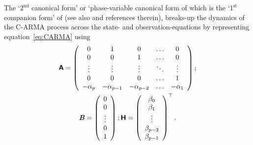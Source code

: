 \documentclass[a4paper,fleqn,usenatbib]{mnras}
\begin{document}
The `$2^{\mathrm{nd}}$ canonical form' or `phase-variable canonical form of \citet{Wiberg} which is the `$1^{\mathrm{st}}$ companion form' of \citet{Friedland} (see also \citealp{Kelly14} and references therein), breaks-up the dynamics of the C-ARMA process across the state- and observation-equations by representing equation~\eqref{eq:CARMA} using
\begin{multline}\label{eq:2ndCanForm}
\textbf{\textsf{A}} = \left( \begin{array}{ccccc} 
0 & 1 & 0 & \hdots & 0 \\
0 & 0 & 1 & \hdots & 0 \\
\vdots & \vdots & \vdots & \ddots & \vdots \\
0 & 0 & 0 & \hdots & 1 \\
-\alpha_{p} & -\alpha_{p-1} & -\alpha_{p-2} & \hdots & -\alpha_{1} \\
\end{array}\right); \\ \textbf{\textit{B}} = \left( \begin{array}{c} 0 \\ 0 \\ \vdots \\ 0 \\ 1 \end{array} \right); \textbf{\textsf{H}} = \left( \begin{array}{c} \beta_{0} \\ \beta_{1} \\ \vdots \\ \beta_{p-2} \\ \beta_{p-1} \end{array} \right)^{\top}.
\end{multline}
\end{document}
